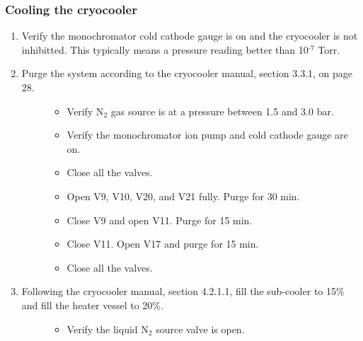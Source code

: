 \documentclass[letterpaper,10pt,english]{sphinxmanual}
\begin{document}
\subsubsection{Cooling the cryocooler}
\label{\detokenize{staff:cooling-the-cryocooler}}\begin{enumerate}
\def\theenumi{\arabic{enumi}}
\def\labelenumi{\theenumi .}
\makeatletter\def\p@enumii{\p@enumi \theenumi .}\makeatother
\item {} 
Verify the monochromator cold cathode gauge is on and the cryocooler is not inhibitted. This typically means a pressure reading better than 10$^{\text{-7}}$ Torr.

\item {} \begin{description}
\item[{Purge the system according to the cryocooler manual, section 3.3.1, on page 28. }] \leavevmode\begin{itemize}
\item {} 
Verify N$_{\text{2}}$ gas source is at a pressure between 1.5 and 3.0 bar.

\item {} 
Verify the monochromator ion pump and cold cathode gauge are on.

\item {} 
Close all the valves.

\item {} 
Open V9, V10, V20, and V21 fully. Purge for 30 min.

\item {} 
Close V9 and open V11. Purge for 15 min.

\item {} 
Close V11. Open V17 and purge for 15 min.

\item {} 
Close all the valves.

\end{itemize}

\end{description}

\item {} \begin{description}
\item[{Following the cryocooler manual, section 4.2.1.1, fill the sub-cooler to 15\% and fill the heater vessel to 20\%.}] \leavevmode\begin{itemize}
\item {} 
Verify the liquid N$_{\text{2}}$ source valve is open.


\end{itemize}
\end{description}
\end{enumerate}
\end{document}

